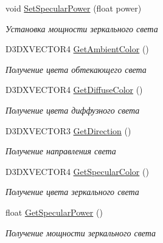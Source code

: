 \begin{DoxyCompactItemize}
void \hyperlink{class_light_class_ad32094e8972d08ba272cffea4f6839e1}{Set\+Specular\+Power} (float power)
\begin{DoxyCompactList}\small\item\em Установка мощности зеркального света \end{DoxyCompactList}\item 
D3\+D\+X\+V\+E\+C\+T\+O\+R4 \hyperlink{class_light_class_a74a0a9d243b8c1347ab000bdfa1b2471}{Get\+Ambient\+Color} ()
\begin{DoxyCompactList}\small\item\em Получение цвета обтекающего света \end{DoxyCompactList}\item 
D3\+D\+X\+V\+E\+C\+T\+O\+R4 \hyperlink{class_light_class_a93a1bb92f155978b8bf87c936d3e509c}{Get\+Diffuse\+Color} ()
\begin{DoxyCompactList}\small\item\em Получение цвета диффузного света \end{DoxyCompactList}\item 
D3\+D\+X\+V\+E\+C\+T\+O\+R3 \hyperlink{class_light_class_aab07422c64d1a4388b0055f532235dcc}{Get\+Direction} ()
\begin{DoxyCompactList}\small\item\em Получение направления света \end{DoxyCompactList}\item 
D3\+D\+X\+V\+E\+C\+T\+O\+R4 \hyperlink{class_light_class_ab5f7e02afb18d90656337397dfc234a4}{Get\+Specular\+Color} ()
\begin{DoxyCompactList}\small\item\em Получение цвета зеркального света \end{DoxyCompactList}\item 
float \hyperlink{class_light_class_ad84d8444a33be065ec7ef8a83d0de992}{Get\+Specular\+Power} ()
\begin{DoxyCompactList}\small\item\em Получение мощности зеркального света \end{DoxyCompactList}\end{DoxyCompactItemize}
